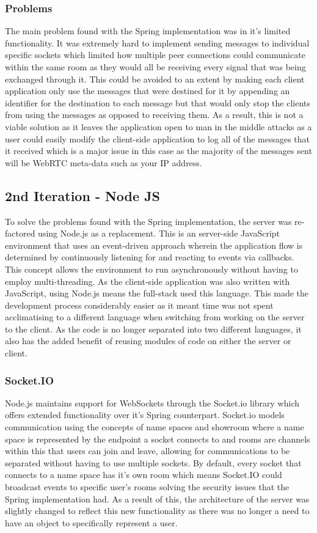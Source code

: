 \documentclass[]{report}
\begin{document}
				\subsubsection*{Problems}
				The main problem found with the Spring implementation was in it's limited functionality. It was extremely hard to implement sending messages to individual specific sockets which limited how multiple peer connections could communicate within the same room as they would all be receiving every signal that was being exchanged through it. This could be avoided to an extent by making each client application only use the messages that were destined for it by appending an identifier for the destination to each message but that would only stop the clients from using the messages as opposed to receiving them. As a result, this is not a viable solution as it leaves the application open to man in the middle attacks as a user could easily modify the client-side application to log all of the messages that it received which is a major issue in this case as the majority of the messages sent will be WebRTC meta-data such as your IP address.
				
			\subsection{2nd Iteration - Node JS}
			To solve the problems found with the Spring implementation, the server was re-factored using Node.js as a replacement. This is an server-side JavaScript environment that uses an event-driven approach wherein the application flow is determined by continuously listening for and reacting to events via callbacks. This concept allows the environment to run asynchronously without having to employ multi-threading. As the client-side application was also written with JavaScript, using Node.js means the full-stack used this language. This made the development process considerably easier as it meant time was not spent acclimatising to a different language when switching from working on the server to the client. As the code is no longer separated into two different languages, it also has the added benefit of reusing modules of code on either the server or client.
				\subsubsection*{Socket.IO}
				Node.js maintains support for WebSockets through the Socket.io library which offers extended functionality over it's Spring counterpart. Socket.io models communication using the concepts of name spaces and showroom where a name space is represented by the endpoint a socket connects to and rooms are channels within this that users can join and leave, allowing for communications to be separated without having to use multiple sockets. By default, every socket that connects to a name space has it's own room which means Socket.IO could broadcast events to specific user's rooms solving the security issues that the Spring implementation had. As a result of this, the architecture of the server was slightly changed to reflect this new functionality as there was no longer a need to have an object to specifically represent a user. 
				
\end{document}
